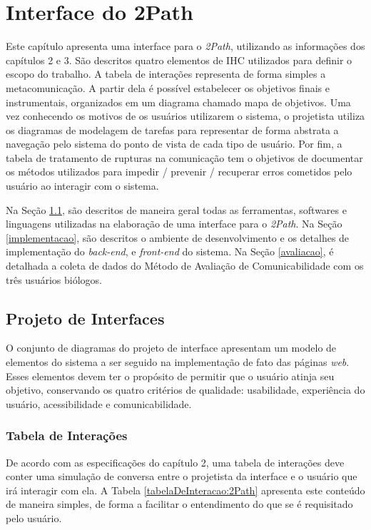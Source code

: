 \chapter{Interface do 2Path}

\indent Este capítulo apresenta uma interface para o \textit{2Path}, utilizando as informações dos capítulos 2 e 3. São descritos quatro elementos de IHC utilizados para definir o escopo do trabalho. A tabela de interações representa de forma simples a metacomunicação. A partir dela é possível estabelecer os objetivos finais e instrumentais, organizados em um diagrama chamado mapa de objetivos. Uma vez conhecendo os motivos de os usuários utilizarem o sistema, o projetista utiliza os diagramas de modelagem de tarefas para representar de forma abstrata a navegação pelo sistema do ponto de vista de cada tipo de usuário. Por fim, a tabela de tratamento de rupturas na comunicação tem o objetivos de documentar os métodos utilizados para impedir / prevenir / recuperar erros cometidos pelo usuário ao interagir com o sistema.

\indent Na Seção \ref{projeto}, são descritos de maneira geral todas as ferramentas, softwares e linguagens utilizadas na elaboração de uma interface para o \textit{2Path}. Na Seção \ref{implementacao}, são descritos o ambiente de desenvolvimento e os detalhes de implementação do \textit{back-end}, e \textit{front-end} do sistema. Na Seção \ref{avaliacao}, é detalhada a coleta de dados do Método de Avaliação de Comunicabilidade com os três usuários biólogos.

\section{Projeto de Interfaces} \label{projeto}

\indent O conjunto de diagramas do projeto de interface apresentam um modelo de elementos do sistema a ser seguido na implementação de fato das páginas \textit{web}. Esses elementos devem ter o propósito de permitir que o usuário atinja seu objetivo, conservando os quatro critérios de qualidade: usabilidade, experiência do usuário, acessibilidade e comunicabilidade.

\subsection{Tabela de Interações}

\indent De acordo com as especificações do capítulo 2, uma tabela de interações deve conter uma simulação de conversa entre o projetista da interface e o usuário que irá interagir com ela. A Tabela \ref{tabelaDeInteracao:2Path} apresenta este conteúdo de maneira simples, de forma a facilitar o entendimento do que se é requisitado pelo usuário. 

